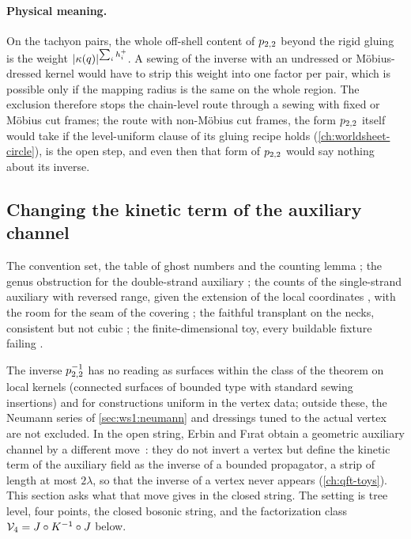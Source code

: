 \paragraph{Physical meaning.}
On the tachyon pairs, the whole off-shell content of $p_{2,2}$ beyond the rigid gluing is the weight ${|\kappa(q)|}^{\sum_i h_i^+}$.
A sewing of the inverse with an undressed or Möbius-dressed kernel would have to strip this weight into one factor per pair, which is possible only if the mapping radius is the same on the whole region.
The exclusion therefore stops the chain-level route through a sewing with fixed or Möbius cut frames; the route with non-Möbius cut frames, the form $p_{2,2}$ itself would take if the level-uniform clause of its gluing recipe holds (\cref{ch:worldsheet-circle}), is the open step, and even then that form of $p_{2,2}$ would say nothing about its inverse.

\subsection{Changing the kinetic term of the auxiliary channel}
\label{sec:ws1:kinetic}

The convention set, the table of ghost numbers and the counting lemma ; the genus obstruction for the double-strand auxiliary ; the counts of the single-strand auxiliary with reversed range, given the extension of the local coordinates , with the room for the seam of the covering ; the faithful transplant on the necks, consistent but not cubic ; the finite-dimensional toy, every buildable fixture failing .

The inverse $p_{2,2}^{-1}$ has no reading as surfaces within the class of the theorem on local kernels (connected surfaces of bounded type with standard sewing insertions) and for constructions uniform in the vertex data; outside these, the Neumann series of \cref{sec:ws1:neumann} and dressings tuned to the actual vertex are not excluded.
In the open string, Erbin and F{\i}rat obtain a geometric auxiliary channel by a different move~\cite{Erbin:2024:OpenStringStub}: they do not invert a vertex but define the kinetic term of the auxiliary field as the inverse of a bounded propagator, a strip of length at most $2 \lambda$, so that the inverse of a vertex never appears (\cref{ch:qft-toys}).
This section asks what that move gives in the closed string.
The setting is tree level, four points, the closed bosonic string, and the factorization class $\mathcal{V}_{4} = J \circ K^{-1} \circ J$ below.

